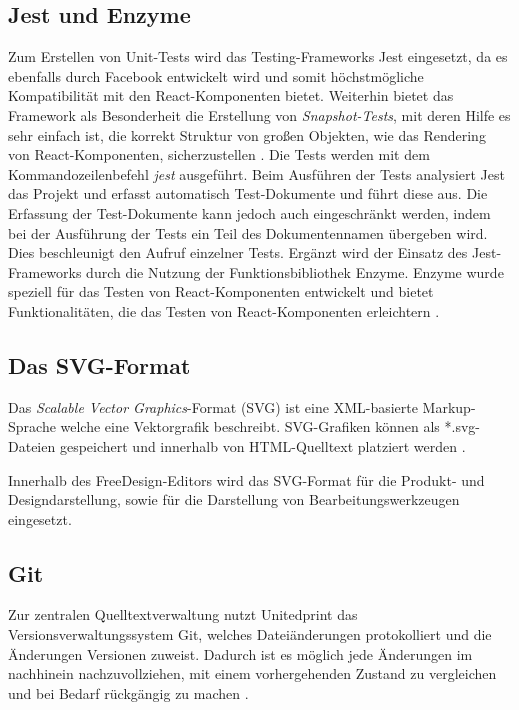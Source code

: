 \subsection{Jest und Enzyme}
Zum Erstellen von Unit-Tests wird das Testing-Frameworks Jest eingesetzt, da es ebenfalls durch Facebook entwickelt wird und somit höchstmögliche Kompatibilität mit den React-Komponenten bietet. Weiterhin bietet das Framework als Besonderheit die Erstellung von \emph{Snapshot-Tests}, mit deren Hilfe es sehr einfach ist, die korrekt Struktur von großen Objekten, wie das Rendering von React-Komponenten, sicherzustellen \autocite[vgl.][]{Facebook:JestIntroduction}.
Die Tests werden mit dem Kommandozeilenbefehl \emph{jest} ausgeführt.
Beim Ausführen der Tests analysiert Jest das Projekt und erfasst automatisch Test-Dokumente und führt diese aus. 
Die Erfassung der Test-Dokumente kann jedoch auch eingeschränkt werden, indem bei der Ausführung der Tests ein Teil des Dokumentennamen übergeben wird. Dies beschleunigt den Aufruf einzelner Tests. 
Ergänzt wird der Einsatz des Jest-Frameworks durch die Nutzung der Funktionsbibliothek Enzyme. Enzyme wurde speziell für das Testen von React-Komponenten entwickelt und bietet Funktionalitäten, die das Testen von React-Komponenten erleichtern \autocite[vgl.][]{Enzyme:Introduction}.

\subsection{Das SVG-Format}
Das \emph{Scalable Vector Graphics}-Format (SVG) ist eine XML-basierte Markup-Sprache welche eine Vektorgrafik beschreibt. SVG-Grafiken können als *.svg-Dateien gespeichert und innerhalb von HTML-Quelltext platziert werden \autocite[vgl.][]{W3C:AboutSVG}. 

Innerhalb des FreeDesign-Editors wird das SVG-Format für die Produkt- und Designdarstellung, sowie für die Darstellung von Bearbeitungswerkzeugen eingesetzt. 

\subsection{Git}
\label{chap:git}
Zur zentralen Quelltextverwaltung nutzt Unitedprint das Versionsverwaltungssystem Git, welches Dateiänderungen protokolliert und die Änderungen Versionen zuweist. Dadurch ist es möglich jede Änderungen im nachhinein nachzuvollziehen, mit einem vorhergehenden Zustand zu vergleichen und bei Bedarf rückgängig zu machen \autocite[vgl.][]{Git:About}.

